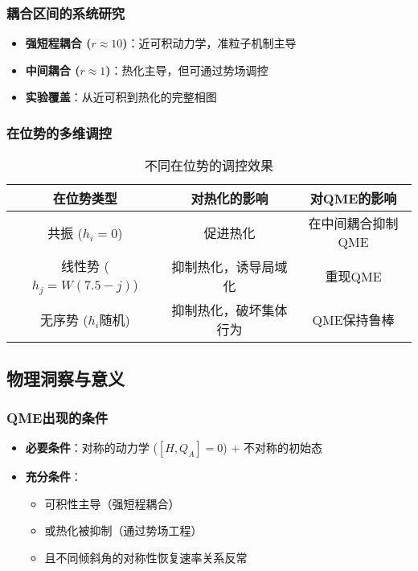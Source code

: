 \documentclass[11pt,a4paper]{article}
\begin{document}
\subsubsection{耦合区间的系统研究}
\begin{itemize}
    \item \textbf{强短程耦合 ($r \approx 10$)}：近可积动力学，准粒子机制主导
    \item \textbf{中间耦合 ($r \approx 1$)}：热化主导，但可通过势场调控
    \item \textbf{实验覆盖}：从近可积到热化的完整相图
\end{itemize}

\subsubsection{在位势的多维调控}
\begin{table}[H]
\centering
\caption{不同在位势的调控效果}
\begin{tabular}{|c|c|c|}
\hline
\textbf{在位势类型} & \textbf{对热化的影响} & \textbf{对QME的影响} \\
\hline
共振 ($h_i = 0$) & 促进热化 & 在中间耦合抑制QME \\
\hline
线性势 ($h_j = W(7.5-j)$) & 抑制热化，诱导局域化 & 重现QME \\
\hline
无序势 ($h_i$随机) & 抑制热化，破坏集体行为 & QME保持鲁棒 \\
\hline
\end{tabular}
\end{table}

\subsection{物理洞察与意义}

\subsubsection{QME出现的条件}
\begin{itemize}
    \item \textbf{必要条件}：对称的动力学 ($[H,Q_A]=0$) + 不对称的初始态
    \item \textbf{充分条件}：
    \begin{itemize}
        \item 可积性主导（强短程耦合）
        \item 或热化被抑制（通过势场工程）
        \item 且不同倾斜角的对称性恢复速率关系反常
    \end{itemize}
\end{itemize}
\end{document}
